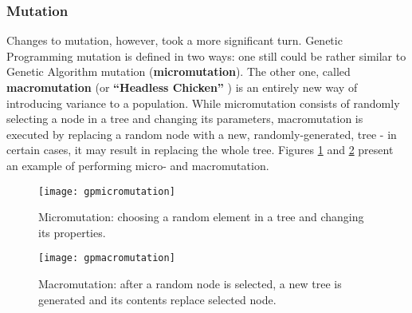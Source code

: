 \subsubsection{Mutation}
Changes to mutation, however, took a more significant turn. Genetic Programming mutation is defined in two ways: one still could be rather similar to Genetic Algorithm mutation (\textbf{micromutation}). The other one, called \textbf{macromutation} (or \textbf{``Headless Chicken''} ) is an entirely new way of introducing variance to a population. While micromutation consists of randomly selecting a node in a tree and changing its parameters, macromutation is executed by replacing a random node with a new, randomly-generated, tree - in certain cases, it may result in replacing the whole tree. Figures \ref{fig:x gpmicromutationexample} and \ref{fig:x gpmacromutationexample} present an example of performing micro- and macromutation.
\begin{figure}[h]
    \centering
    \texttt{[image: gpmicromutation]}
    \caption{Micromutation: choosing a random element in a tree and changing its properties.}
    \label{fig:x gpmicromutationexample}
\end{figure}
\begin{figure}[h]
    \centering
    \texttt{[image: gpmacromutation]}
    \caption{Macromutation: after a random node is selected, a new tree is generated and its contents replace selected node.}
    \label{fig:x gpmacromutationexample}
\end{figure}

